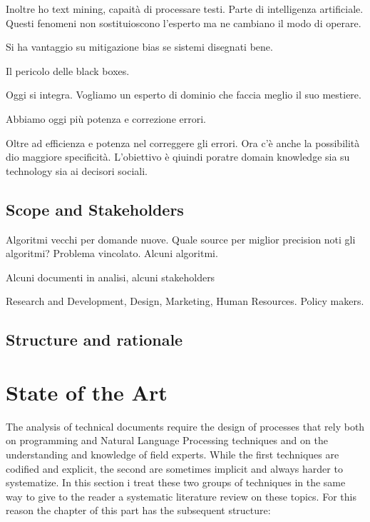 \documentclass[]{book}
\begin{document}
Inoltre ho text mining, capaità di processare testi. Parte di
intelligenza artificiale. Questi fenomeni non sostituioscono l'esperto
ma ne cambiano il modo di operare.

Si ha vantaggio su mitigazione bias se sistemi disegnati bene.

Il pericolo delle black boxes.

Oggi si integra. Vogliamo un esperto di dominio che faccia meglio il suo
mestiere.

Abbiamo oggi più potenza e correzione errori.

Oltre ad efficienza e potenza nel correggere gli errori. Ora c'è anche
la possibilità dio maggiore specificità. L'obiettivo è qiuindi poratre
domain knowledge sia su technology sia ai decisori sociali.

\chapter{Scope and Stakeholders}\label{scope-and-stakeholders}

Algoritmi vecchi per domande nuove. Quale source per miglior precision
noti gli algoritmi? Problema vincolato. Alcuni algoritmi.

Alcuni documenti in analisi, alcuni stakeholders

Research and Development, Design, Marketing, Human Resources. Policy
makers.

\chapter{Structure and rationale}\label{structure-and-rationale}

\part{State of the Art}\label{part-state-of-the-art}

The analysis of technical documents require the design of processes that
rely both on programming and Natural Language Processing techniques and
on the understanding and knowledge of field experts. While the first
techniques are codified and explicit, the second are sometimes implicit
and always harder to systematize. In this section i treat these two
groups of techniques in the same way to give to the reader a systematic
literature review on these topics. For this reason the chapter of this
part has the subsequent structure:
\end{document}
